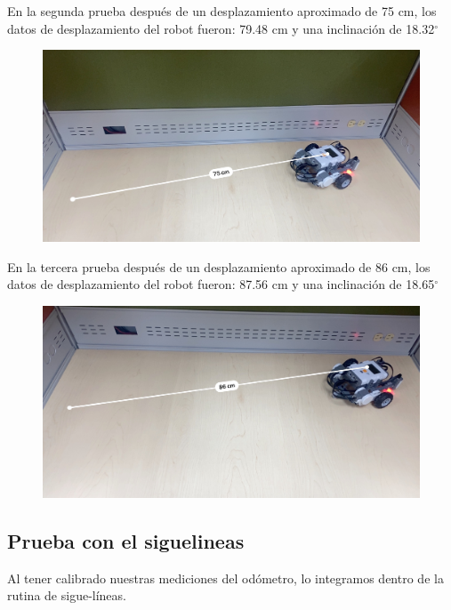 \documentclass[oneside,twocolumn]{article}
\begin{document}
\newpage
En la segunda prueba después de un desplazamiento aproximado de 75 cm, los datos de desplazamiento del robot fueron: 79.48 cm y una inclinación de 18.32$^{\circ}$
\begin{figure}[!hb]
  \centering
  \includegraphics[scale=0.18]{graficos/prueba2.JPG}
\end{figure}

En la tercera prueba después de un desplazamiento aproximado de 86 cm, los datos de desplazamiento del robot fueron: 87.56 cm y una inclinación de 18.65$^{\circ}$

\begin{figure}[!hb]
  \centering
  \includegraphics[scale=0.18]{graficos/prueba3.JPG}
\end{figure}

\newpage
\subsection{Prueba con el siguelineas}

Al tener calibrado nuestras mediciones del odómetro, lo integramos dentro de la rutina de sigue-líneas.
\end{document}
